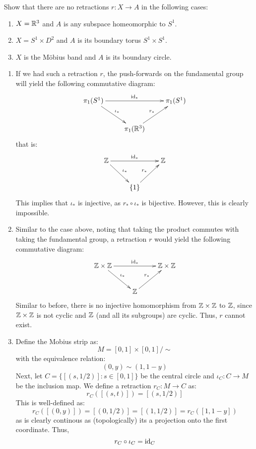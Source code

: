 \documentclass[12pt]{article}
\begin{document}
\begin{problem}{3}
    Show that there are no retractions $r \colon X \to A$ in the following cases:
    \begin{enumerate}
    \item $X = \mathbb R^3$ and $A$ is any subspace homeomorphic to $S^1$.
    \item $X = S^1 \times D^2$ and $A$ is its boundary torus $S^1 \times S^1$.
    \item $X$ is the M{\" o}bius band and $A$ is its boundary circle.
    \end{enumerate}
\end{problem}
\begin{solution}
    \bbni
    \begin{enumerate}
        \item If we had such a retraction $r$, the push-forwards on the fundamental group will yield the following commutative diagram:
        \[ \xymatrix{ \pi_1(S^1) \ar[rr]^{\id_*} \ar[rd]^{\iota_*} & & \pi_1(S^1) \\ 
        & \pi_1(\R^3) \ar[ur]^{r_*}} \]
        that is:
        \[ \xymatrix{ \Z \ar[rr]^{\id_*} \ar[rd]^{\iota_*} & & \Z \\ 
        & \{1\} \ar[ur]^{r_*}} \]
        This implies that $\iota_*$ is injective, as $r_* \circ \iota_*$ is bijective. However, this is clearly impossible.
        \item Similar to the case above, noting that taking the product commutes with taking the fundamental group, a retraction $r$ would yield the following commutative diagram:
        \[ \xymatrix{ \Z \times \Z \ar[rr]^{\id_*} \ar[rd]^{\iota_*} & & \Z \times \Z\\ 
        & \Z \ar[ur]^{r_*}} \]       
        Similar to before, there is no injective homomorphism from $\mathbb Z \times \mathbb Z$ to $\mathbb Z$, since $\mathbb Z \times \mathbb Z$ is not cyclic and $\mathbb Z$ (and all its subgroups) are cyclic. Thus, $r$ cannot exist.
        \item Define the Mobius strip as:
        \[ M = [0,1] \times [0, 1] / \sim\]
        with the equivalence relation:
        \[ (0, y) \sim (1, 1-y)\]
        Next, let $C = \{[(s, 1/2)]: s\in [0, 1]\}$ be the central circle and $\iota_C: C \to M$ be the inclusion map. We define a retraction $r_C: M \to C$ as:
        \[r_C( [(s, t)]) = [(s, 1/2)]\]
        This is well-defined as: 
        \[r_C([(0, y)]) = [(0, 1/2)] = [(1, 1/2)] = r_C([1, 1-y])\]
        as is clearly continous as (topologically) its a projection onto the first coordinate. Thus,
        \[r_C \circ \iota_C = \operatorname{id}_C \]

\end{enumerate}
\end{solution}
\end{document}
